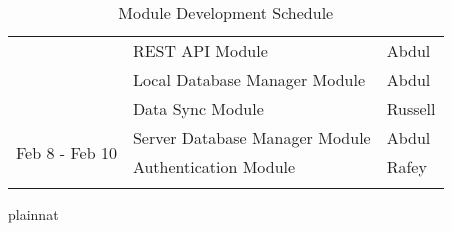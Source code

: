 \documentclass[12pt, titlepage]{article}
\begin{document}
\begin{table}[H]
\begin{tabular}{lll}
\multicolumn{1}{|l|}{}                                 & \multicolumn{1}{l|}{REST API Module}                          & \multicolumn{1}{l|}{Abdul}                    \\ \cline{2-3} 
\multicolumn{1}{|l|}{}                                 & \multicolumn{1}{l|}{Local Database Manager Module}             & \multicolumn{1}{l|}{Abdul}                    \\ \cline{2-3} 
\multicolumn{1}{|l|}{}                                 & \multicolumn{1}{l|}{Data Sync Module}                         & \multicolumn{1}{l|}{Russell}                  \\ \hline
\multicolumn{1}{|l|}{\multirow{2}{*}{Feb 8 - Feb 10}}  & \multicolumn{1}{l|}{Server Database Manager Module}            & \multicolumn{1}{l|}{Abdul}                    \\ \cline{2-3} 
\multicolumn{1}{|l|}{}                                 & \multicolumn{1}{l|}{Authentication Module}                    & \multicolumn{1}{l|}{Rafey}                    \\ \hline
                                                       &                                                                &                                              
\end{tabular}
\caption{Module Development Schedule}
\label{tab:module_schedule}
\end{table}

 {plainnat}


\newpage{}
\end{document}
